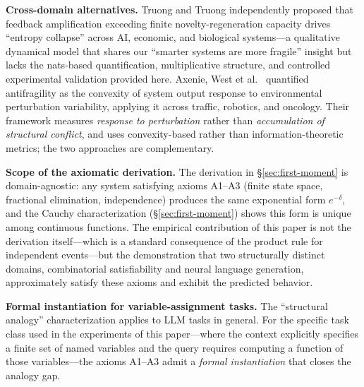 \documentclass[11pt,a4paper]{article}
\begin{document}
\textbf{Cross-domain alternatives.} Truong and Truong \citep{truong2025entropy} independently proposed that feedback amplification exceeding finite novelty-regeneration capacity drives ``entropy collapse'' across AI, economic, and biological systems---a qualitative dynamical model that shares our ``smarter systems are more fragile'' insight but lacks the nats-based quantification, multiplicative structure, and controlled experimental validation provided here. Axenie, West et al.\ \citep{axenie2024antifragility} quantified antifragility as the convexity of system output response to environmental perturbation variability, applying it across traffic, robotics, and oncology. Their framework measures \emph{response to perturbation} rather than \emph{accumulation of structural conflict}, and uses convexity-based rather than information-theoretic metrics; the two approaches are complementary.

\textbf{Scope of the axiomatic derivation.} The derivation in \S\ref{sec:first-moment} is domain-agnostic: any system satisfying axioms A1--A3 (finite state space, fractional elimination, independence) produces the same exponential form $e^{-\delta}$, and the Cauchy characterization (\S\ref{sec:first-moment}) shows this form is unique among continuous functions. The empirical contribution of this paper is not the derivation itself---which is a standard consequence of the product rule for independent events---but the demonstration that two structurally distinct domains, combinatorial satisfiability and neural language generation, approximately satisfy these axioms and exhibit the predicted behavior.

\textbf{Formal instantiation for variable-assignment tasks.}\label{sec:formal-instantiation}
The ``structural analogy'' characterization applies to LLM tasks in general. For the specific task class used in the experiments of this paper---where the context explicitly specifies a finite set of named variables and the query requires computing a function of those variables---the axioms A1--A3 admit a \emph{formal instantiation} that closes the analogy gap.
\end{document}
